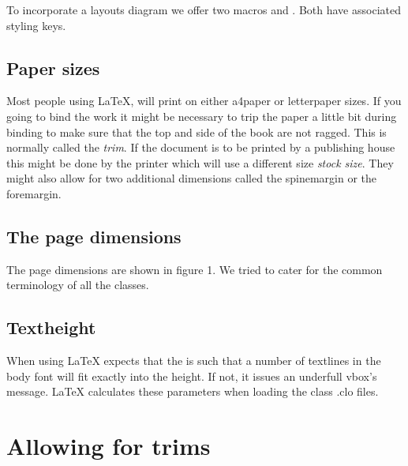 To incorporate a layouts diagram we offer two macros  and . Both have associated styling keys.
\medskip


\subsection{Paper sizes}
Most people using LaTeX, will print on either a4paper or letterpaper sizes. If you going to bind the work it might be necessary to trip the paper a little bit during binding to make sure that the top and side of the book are not ragged. This is normally called the \textit{trim}. If the document is to be printed by a publishing house this might be done by the printer which will use a different size \textit{stock size}. They might also allow for two additional dimensions called the spinemargin or the foremargin.

\subsection{The page dimensions}

The page dimensions are shown in figure 1. We tried to cater for the common terminology of all the classes.

\subsection{Textheight}

When using  LaTeX expects that the  is such that a number of textlines in the body font will fit exactly into the height. If not, it issues an underfull vbox's message. LaTeX calculates these parameters when loading the class .clo files.
 



\section{Allowing for trims}
\newpage



\drawlayout
 
\clearpage

\drawlayout



